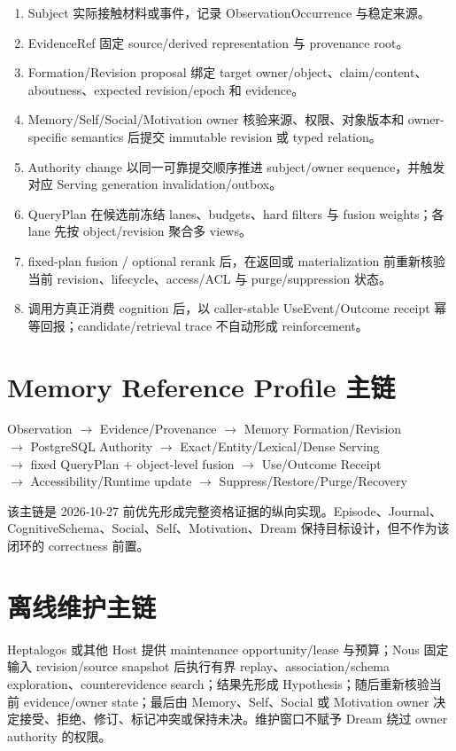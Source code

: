 \begin{enumerate}
\item Subject 实际接触材料或事件，记录 ObservationOccurrence 与稳定来源。
\item EvidenceRef 固定 source/derived representation 与 provenance root。
\item Formation/Revision proposal 绑定 target owner/object、claim/content、aboutness、expected revision/epoch 和 evidence。
\item Memory/Self/Social/Motivation owner 核验来源、权限、对象版本和 owner-specific semantics 后提交 immutable revision 或 typed relation。
\item Authority change 以同一可靠提交顺序推进 subject/owner sequence，并触发对应 Serving generation invalidation/outbox。
\item QueryPlan 在候选前冻结 lanes、budgets、hard filters 与 fusion weights；各 lane 先按 object/revision 聚合多 views。
\item fixed-plan fusion / optional rerank 后，在返回或 materialization 前重新核验当前 revision、lifecycle、access/ACL 与 purge/suppression 状态。
\item 调用方真正消费 cognition 后，以 caller-stable UseEvent/Outcome receipt 幂等回报；candidate/retrieval trace 不自动形成 reinforcement。
\end{enumerate}

\section{Memory Reference Profile 主链}

\begin{center}
Observation $\rightarrow$ Evidence/Provenance $\rightarrow$ Memory Formation/Revision\\
$\rightarrow$ PostgreSQL Authority $\rightarrow$ Exact/Entity/Lexical/Dense Serving\\
$\rightarrow$ fixed QueryPlan + object-level fusion $\rightarrow$ Use/Outcome Receipt\\
$\rightarrow$ Accessibility/Runtime update $\rightarrow$ Suppress/Restore/Purge/Recovery
\end{center}

该主链是 2026-10-27 前优先形成完整资格证据的纵向实现。Episode、Journal、CognitiveSchema、Social、Self、Motivation、Dream 保持目标设计，但不作为该闭环的 correctness 前置。

\section{离线维护主链}

Heptalogos 或其他 Host 提供 maintenance opportunity/lease 与预算；Nous 固定输入 revision/source snapshot 后执行有界 replay、association/schema exploration、counterevidence search；结果先形成 Hypothesis；随后重新核验当前 evidence/owner state；最后由 Memory、Self、Social 或 Motivation owner 决定接受、拒绝、修订、标记冲突或保持未决。维护窗口不赋予 Dream 绕过 owner authority 的权限。
